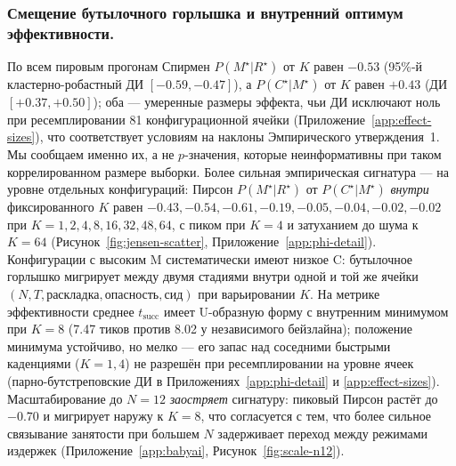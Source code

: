 \documentclass{article}
\begin{document}
\subsubsection{Смещение бутылочного горлышка и внутренний оптимум эффективности.}
По всем пировым прогонам Спирмен $P(M^\star|R^\star)$ от $K$ равен $-0.53$ (95\%-й кластерно-робастный ДИ $[-0.59,-0.47]$), а $P(C^\star|M^\star)$ от $K$ равен $+0.43$ (ДИ $[+0.37,+0.50]$); оба --- умеренные размеры эффекта, чьи ДИ исключают ноль при ресемплировании 81 конфигурационной ячейки (Приложение~\ref{app:effect-sizes}), что соответствует условиям на наклоны Эмпирического утверждения~1. Мы сообщаем именно их, а не $p$-значения, которые неинформативны при таком коррелированном размере выборки. Более сильная эмпирическая сигнатура --- на уровне отдельных конфигураций: Пирсон $P(M^\star|R^\star)$ от $P(C^\star|M^\star)$ \emph{внутри} фиксированного $K$ равен $-0.43, -0.54, -0.61, -0.19, -0.05, -0.04, -0.02, -0.02$ при $K{=}1,2,4,8,16,32,48,64$, с пиком при $K{=}4$ и затуханием до шума к $K{=}64$ (Рисунок~\ref{fig:jensen-scatter}, Приложение~\ref{app:phi-detail}). Конфигурации с высоким M систематически имеют низкое C: бутылочное горлышко мигрирует между двумя стадиями внутри одной и той же ячейки $(N,T,\text{раскладка},\text{опасность},\text{сид})$ при варьировании $K$. На метрике эффективности среднее $t_{\mathrm{succ}}$ имеет U-образную форму с внутренним минимумом при $K{=}8$ (7.47 тиков против 8.02 у независимого бейзлайна); положение минимума устойчиво, но мелко --- его запас над соседними быстрыми каденциями ($K{=}1,4$) не разрешён при ресемплировании на уровне ячеек (парно-бутстреповские ДИ в Приложениях~\ref{app:phi-detail} и \ref{app:effect-sizes}). Масштабирование до $N{=}12$ \emph{заостряет} сигнатуру: пиковый Пирсон растёт до $-0.70$ и
мигрирует наружу к $K\!=\!8$, что согласуется с тем, что более сильное связывание
занятости при большем $N$ задерживает переход между режимами издержек
(Приложение~\ref{app:babyai}, Рисунок~\ref{fig:scale-n12}).
\end{document}
